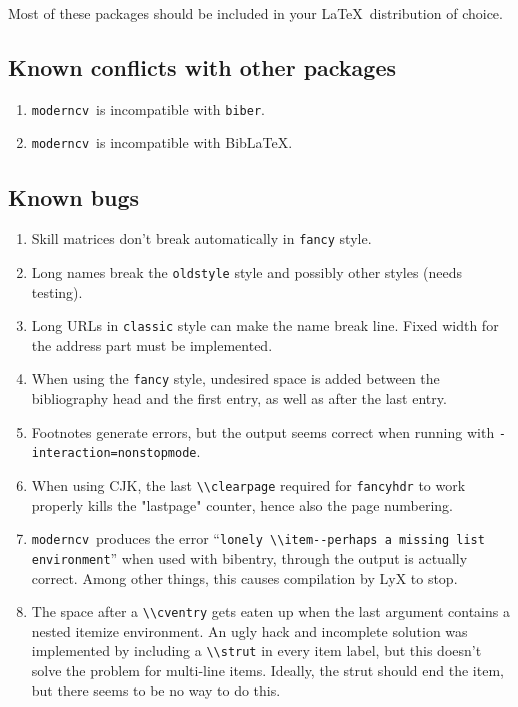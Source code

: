\documentclass[a4paper, 11pt]{article}
\newcommand{\code}[1]{\lstinline!#1!}
\newcommand{\moderncv}{\code{moderncv}}
\newcommand{\Moderncv}{\moderncv~}
\newcommand{\Latex}{\LaTeX~}
\newcommand{\biblatex}{BibLaTeX}
\begin{document}
Most of these packages should be included in your \Latex distribution of choice.

\subsection{Known conflicts with other packages}
\begin{enumerate}
  \item \Moderncv is incompatible with \code{biber}.
  \item \Moderncv is incompatible with \biblatex.
\end{enumerate}

\subsection{Known bugs}
\begin{enumerate}
  \item Skill matrices don't break automatically in \texttt{fancy} style.
  \item Long names break the \texttt{oldstyle} style and possibly other styles (needs testing).
  \item Long URLs in \texttt{classic} style can make the name break line.
  Fixed width for the address part must be implemented.
  \item When using the \texttt{fancy} style, undesired space is added between the bibliography head and the first entry, as well as after the last entry.
  \item Footnotes generate errors, but the output seems correct when running with \code{-interaction=nonstopmode}.
  \item When using CJK, the last \code{\\clearpage} required for \code{fancyhdr} to work properly kills the "lastpage" counter, hence also the page numbering.
  \item \Moderncv produces the error ``\code{lonely \\item--perhaps a missing list environment}'' when used with bibentry, through the output is actually correct.
  Among other things, this causes compilation by LyX to stop.
  \item The space after a \code{\\cventry} gets eaten up when the last argument contains a nested itemize environment.
  An ugly hack and incomplete solution was implemented by including a \code{\\strut} in every item label, but this doesn't solve the problem for multi-line items.
  Ideally, the strut should end the item, but there seems to be no way to do this.
\end{enumerate}
\end{document}
